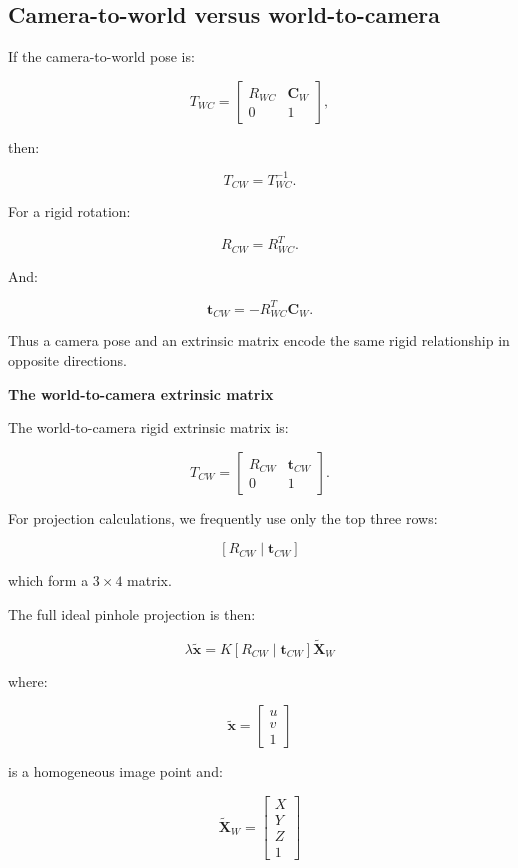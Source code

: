 \subsection{Camera-to-world versus world-to-camera}\label{02-foundations-ii-ch035-camera-to-world-versus-world-to-camera}

If the camera-to-world pose is:

\[
 T_{WC}= \begin{bmatrix} R_{WC}&\mathbf C_W\\ 0&1 \end{bmatrix},
\]

then:

\[
 \boxed{ T_{CW}=T_{WC}^{-1} }.
\]

For a rigid rotation:

\[
 R_{CW}=R_{WC}^T.
\]

And:

\[
 \boxed{ \mathbf t_{CW}=-R_{WC}^T\mathbf C_W }.
\]

Thus a camera pose and an extrinsic matrix encode the same rigid relationship in opposite directions.

\textbf{The world-to-camera extrinsic matrix}

The world-to-camera rigid extrinsic matrix is:

\[
 \boxed{ T_{CW}= \begin{bmatrix} R_{CW}&\mathbf t_{CW}\\ 0&1 \end{bmatrix} }.
\]

For projection calculations, we frequently use only the top three rows:

\[
 \boxed{ [R_{CW}\mid\mathbf t_{CW}] }
\]

which form a \(3\times4\) matrix.

The full ideal pinhole projection is then:

\[
 \boxed{ \lambda\tilde{\mathbf x} = K[R_{CW}\mid\mathbf t_{CW}] \tilde{\mathbf X}_W }
\]

where:

\[
 \tilde{\mathbf x}= \begin{bmatrix}u\\v\\1\end{bmatrix}
\]

is a homogeneous image point and:

\[
 \tilde{\mathbf X}_W= \begin{bmatrix}X\\Y\\Z\\1\end{bmatrix}
\]

